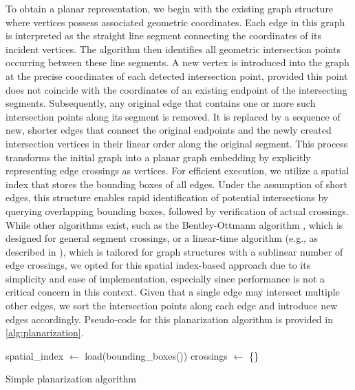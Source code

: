 To obtain a planar representation, we begin with the existing graph structure where vertices possess associated geometric coordinates.
Each edge in this graph is interpreted as the straight line segment connecting the coordinates of its incident vertices.
The algorithm then identifies all geometric intersection points occurring between these line segments.
A new vertex is introduced into the graph at the precise coordinates of each detected intersection point, provided this point does not coincide with the coordinates of an existing endpoint of the intersecting segments.
Subsequently, any original edge that contains one or more such intersection points along its segment is removed.
It is replaced by a sequence of new, shorter edges that connect the original endpoints and the newly created intersection vertices in their linear order along the original segment.
This process transforms the initial graph into a planar graph embedding by explicitly representing edge crossings as vertices.
For efficient execution, we utilize a spatial index that stores the bounding boxes of all
edges. Under the assumption of short edges, this structure enables rapid
identification of potential intersections by querying overlapping bounding
boxes, followed by verification of actual crossings. While other algorithms
exist, such as the Bentley-Ottmann algorithm \cite{bentley_algorithms_1979},
which is designed for general segment crossings, or a linear-time algorithm
(e.g., as described in \cite{eppstein_linear-time_2010}), which is tailored for
graph structures with a sublinear number of edge crossings, we opted for this
spatial index-based approach due to its simplicity and ease of implementation,
especially since performance is not a critical concern in this context. Given
that a single edge may intersect multiple other edges, we sort the intersection
points along each edge and introduce new edges accordingly. Pseudo-code for
this planarization algorithm is provided in \cref{alg:planarization}.

\begin{algorithm}[b]
	\BlankLine
	spatial\_index \(\longleftarrow\) load(bounding\_boxes(\E))\;
	crossings \(\longleftarrow\) \{\}\;
	\caption{Simple planarization algorithm \label{alg:planarization}}
\end{algorithm}

